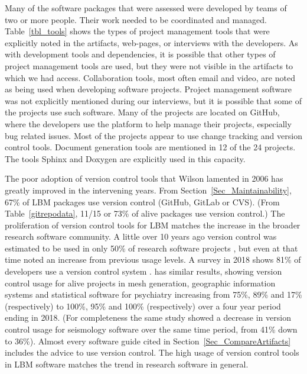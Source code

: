 \documentclass[final, 3p, times, authoryear]{elsarticle}
\begin{document}
Many of the software packages that were assessed were developed by teams of two
or more people. Their work needed to be coordinated and managed.
Table~\ref{tbl_tools} shows the types of project management tools that were
explicitly noted in the artifacts, web-pages, or interviews with the developers.
As with development tools and dependencies, it is possible that other types of
project management tools are used, but they were not visible in the artifacts to
which we had access.  Collaboration tools, most often email and video, are noted
as being used when developing software projects. Project management software was
not explicitly mentioned during our interviews, but it is possible that some of
the projects use such software. Many of the projects are located on GitHub,
where the developers use the platform to help manage their projects, especially
bug related issues. Most of the projects appear to use change tracking and
version control tools. Document generation tools are mentioned in 12 of the 24
projects. The tools Sphinx and Doxygen are explicitly used in this capacity.

The poor adoption of version control tools that Wilson lamented in 2006
\citep{Wilson2006} has greatly improved in the intervening years.  From
Section~\ref{Sec_Maintainability}, 67\% of LBM packages use version control
(GitHub, GitLab or CVS).  (From Table~\ref{gitrepodata}, 11/15 or 73\% of alive
packages use version control.)  The proliferation of version control tools for
LBM matches the increase in the broader research software community.  A little
over 10 years ago version control was estimated to be used in only 50\% of
research software projects \citep{Nguyen-HoanEtAl2010}, but even at that time
\citet{Nguyen-HoanEtAl2010} noted an increase from previous usage levels. A
survey in 2018 shows 81\% of developers use a version control system
\citep{AlNoamanyAndBorghi2018}.  \citet{Smith2018} has similar results, showing
version control usage for alive projects in mesh generation, geographic
information systems and statistical software for psychiatry increasing from
75\%, 89\% and 17\% (respectively) to 100\%, 95\% and 100\% (respectively) over
a four year period ending in 2018.  (For completeness the same study showed a
decrease in version control usage for seismology software over the same time
period, from 41\% down to 36\%).  Almost every software guide cited in
Section~\ref{Sec_CompareArtifacts} includes the advice to use version control.
The high usage of version control tools in LBM software matches the trend in
research software in general.
\end{document}
